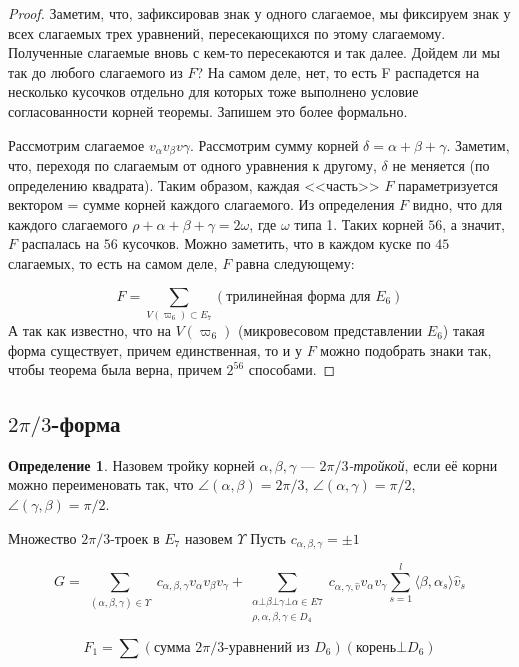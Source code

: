 \documentclass[a4paper,12pt]{amsart}
\theoremstyle{plain}
\theoremstyle{remark}
\theoremstyle{definition}
\newtheorem{definition}{Определение}
\begin{document}
\begin{proof}
 Заметим, что, зафиксировав знак у одного слагаемое, мы фиксируем знак у всех слагаемых трех уравнений, пересекающихся по этому слагаемому. Полученные слагаемые вновь с кем-то пересекаются и так далее. Дойдем ли мы так до любого слагаемого из $F$? На самом деле, нет, то есть F распадется на несколько кусочков отдельно для которых тоже выполнено условие согласованности корней теоремы. Запишем это более формально.
 
 Рассмотрим слагаемое $v_{\alpha}v_{\beta}v{\gamma}$. Рассмотрим сумму корней $\delta=\alpha+\beta+\gamma$.  Заметим, что, переходя по слагаемым от одного уравнения к другому, $\delta$ не меняется (по определению квадрата). Таким образом, каждая <<часть>> $F$ параметризуется вектором = сумме корней каждого слагаемого. Из определения $F$ видно, что для каждого слагаемого $\rho+\alpha+\beta+\gamma = 2\omega$, где $\omega$ типа 1. Таких корней $56$, а значит, $F$ распалась на $56$ кусочков. Можно заметить, что в каждом куске по $45$ слагаемых, то есть на самом деле, $F$ равна следующему:

 $$F = \sum_{V(\varpi_6)\subset E_7}(\text{трилинейная форма для } E_6)$$
А так как известно, что на $V(\varpi_6)$ (микровесовом представлении $E_6$) такая форма существует, причем единственная, то и у $F$ можно подобрать знаки так, чтобы теорема была верна, причем $2^{56}$ способами.
\end{proof}


\subsection{$2\pi/3$-форма}

\begin{definition}
    Назовем тройку корней $\alpha,\beta,\gamma$ ---  \emph{$2\pi/3$-тройкой}, если её корни можно переименовать так, что $\angle(\alpha,\beta)=2\pi/3$,  $\angle(\alpha,\gamma)=\pi/2$, $\angle(\gamma,\beta)=\pi/2$.
\end{definition}
Множество $2\pi/3$-троек в $E_7$ назовем $\Upsilon$
Пусть $c_{\alpha,\beta,\gamma}=\pm1$

$$G = \sum_{\substack{(\alpha, \beta, \gamma) \in \Upsilon}}c_{\alpha,\beta,\gamma}v_{\alpha}v_{\beta}v_{\gamma} + \sum_{\substack{\alpha \bot \beta \bot \gamma\bot\alpha\in E7\\{\rho,\alpha,\beta,\gamma}\in D_4}}
c_{\alpha,\gamma,\hat{v}}v_{\alpha}v_{\gamma}\sum_{s=1}^{l}\langle\beta,\alpha_s\rangle\hat{v}_s $$

$$F_1 = \sum(\text{сумма }2\pi/3\text{-уравнений из }D_6)(\text{корень}\bot D_6)$$
\end{document}
